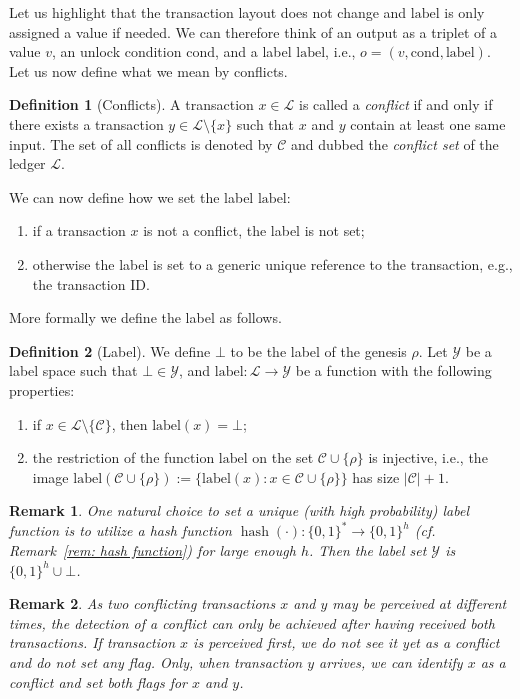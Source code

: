 \documentclass[11pt]{article}
\newcommand{\orig}{\rho}
\newcommand{\cond}{\mathrm{cond}}
\newcommand{\conflictID}{\lab}
\newcommand{\lab}{\mathrm{label}}
\newcommand{\C}{\mathcal{C}}
\newcommand{\labspace}{\mathcal{Y}}
\newcommand{\conflictset}{\mathcal{C}}
\newcommand{\ledger}{\mathcal{L}}
\newcommand{\hash}{\mathop{\mathrm{hash}}}
\theoremstyle{plain}
\newtheorem{remark}{Remark}
\theoremstyle{definition}
\newtheorem{definition}{Definition}
\numberwithin{definition}{section}
\numberwithin{lemma}{section}
\numberwithin{ass}{section}
\numberwithin{remark}{section}
\numberwithin{example}{section}
\numberwithin{proposition}{section}
\numberwithin{theorem}{section}
\begin{document}
Let us highlight that the transaction layout does not change and $\conflictID$ is only assigned a value if needed.
We can therefore think of an output as a triplet of a value $v$, an unlock condition $\cond$, and a  label $\conflictID$, i.e., $o=(v, \cond, \conflictID)$. Let us now define what we mean by conflicts.  

\begin{definition}[Conflicts]\label{def:conflicts}
A transaction $x\in \ledger$ is called a \textit{conflict} if and only if there exists a transaction $y\in \ledger\setminus\{x\}$ such that $x$ and $y$ contain at least one same input. The set of all conflicts is denoted by $\conflictset$ and dubbed the \emph{conflict set} of the ledger $\ledger$.
\end{definition}


{\noindent We can now define how we set the label  $\conflictID$:}
\begin{enumerate}[leftmargin=*]
    \item if a transaction $x$ is not a conflict, the label is not set;
    \item otherwise the label is set to a generic unique reference to the transaction, e.g., the transaction ID. 
\end{enumerate}
{\noindent More formally we define the label as follows.}

\begin{definition}[Label]\label{def:label}
We define $\bot$  to be the label of the  genesis $\orig$. 
Let $\labspace$ be a label space such that $\bot\in\labspace$, and $\lab: \ledger \to \mathcal{Y}$ be a function with the following properties:
\begin{enumerate}[leftmargin=*]
   \item if $x \in \ledger \setminus \{ \C\}$, then $\lab(x)=\bot$;
    \item the restriction of the function $\lab$ on the set $\C\cup \{\orig\}$ is injective, i.e., the image  $\lab(\C\cup \{\orig\}):=\{\lab(x): x\in \C\cup \{\orig\}\}$ has size $|\C|+1$.  
\end{enumerate} 
\end{definition}
\begin{remark}
One natural choice to set a unique (with high probability) label function is to utilize a hash function $\hash(\cdot):  \{0,1\}^*\to \{0,1\}^h$ (cf. Remark~\ref{rem: hash function}) for large enough $h$. Then the label set $\mathcal{Y}$ is $\{0,1\}^h \cup \bot$.
\end{remark}
\begin{remark}
As two conflicting transactions $x$ and $y$ may be perceived at different times, the detection of a conflict can only be achieved after having received both transactions. If transaction $x$ is perceived first, we do not see it yet as a conflict and do not set any flag. Only, when transaction $y$ arrives, we can identify $x$ as a conflict and set both flags for $x$ and $y$. 
\end{remark}
\end{document}
